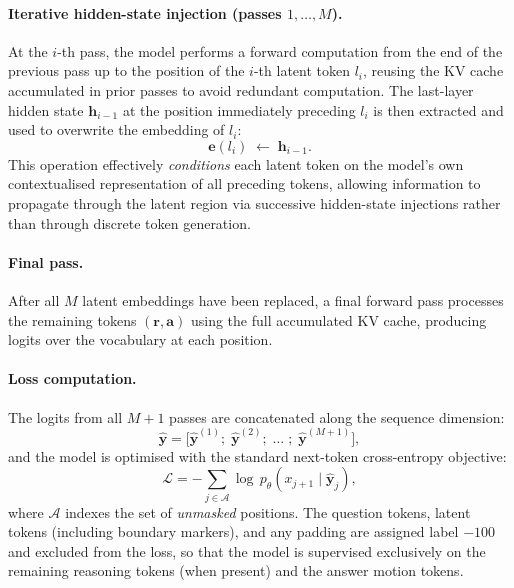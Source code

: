 \paragraph{Iterative hidden-state injection (passes $1,\ldots,M$).}
At the $i$-th pass, the model performs a forward computation from the end
of the previous pass up to the position of the $i$-th latent token $l_i$,
reusing the KV cache accumulated in prior passes to avoid redundant
computation.
The last-layer hidden state $\mathbf{h}_{i-1}$ at the position
immediately preceding $l_i$ is then extracted and used to overwrite the
embedding of $l_i$:
%
\begin{equation}
  \mathbf{e}(l_i) \;\leftarrow\; \mathbf{h}_{i-1}.
  \label{eq:latent_replace}
\end{equation}
%
This operation effectively \emph{conditions} each latent token on the
model's own contextualised representation of all preceding tokens,
allowing information to propagate through the latent region via successive
hidden-state injections rather than through discrete token generation.

\paragraph{Final pass.}
After all $M$ latent embeddings have been replaced, a final forward pass
processes the remaining tokens $(\mathbf{r}, \mathbf{a})$ using the full
accumulated KV cache, producing logits over the vocabulary at each
position.

\paragraph{Loss computation.}
The logits from all $M{+}1$ passes are concatenated along the sequence
dimension:
%
\begin{equation}
  \hat{\mathbf{y}}
  = \big[\hat{\mathbf{y}}^{(1)};\;\hat{\mathbf{y}}^{(2)};\;\ldots\;;\;
    \hat{\mathbf{y}}^{(M+1)}\big],
  \label{eq:logit_concat}
\end{equation}
%
and the model is optimised with the standard next-token cross-entropy
objective:
%
\begin{equation}
  \mathcal{L}
  = -\!\sum_{j\in\mathcal{A}}
    \log\, p_\theta\!\left(x_{j+1}\mid\hat{\mathbf{y}}_j\right),
  \label{eq:loss}
\end{equation}
%
where $\mathcal{A}$ indexes the set of \emph{unmasked} positions.
The question tokens, latent tokens (including boundary markers), and any
padding are assigned label $-100$ and excluded from the loss, so that the
model is supervised exclusively on the remaining reasoning tokens (when
present) and the answer motion tokens.

